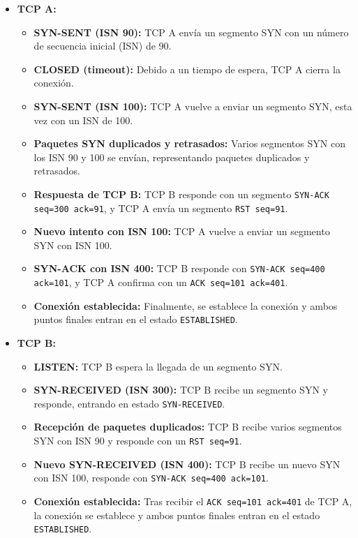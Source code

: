 \documentclass[a4paper,12pt]{article}
\begin{document}
\begin{itemize}
    \item \textbf{TCP A:}
    \begin{itemize}
        \item \textbf{SYN-SENT (ISN 90):} TCP A envía un segmento SYN con un número de secuencia inicial (ISN) de 90.
        \item \textbf{CLOSED (timeout):} Debido a un tiempo de espera, TCP A cierra la conexión.
        \item \textbf{SYN-SENT (ISN 100):} TCP A vuelve a enviar un segmento SYN, esta vez con un ISN de 100.
        \item \textbf{Paquetes SYN duplicados y retrasados:} Varios segmentos SYN con los ISN 90 y 100 se envían, representando paquetes duplicados y retrasados.
        \item \textbf{Respuesta de TCP B:} TCP B responde con un segmento \texttt{SYN-ACK seq=300 ack=91}, y TCP A envía un segmento \texttt{RST seq=91}.
        \item \textbf{Nuevo intento con ISN 100:} TCP A vuelve a enviar un segmento SYN con ISN 100.
        \item \textbf{SYN-ACK con ISN 400:} TCP B responde con \texttt{SYN-ACK seq=400 ack=101}, y TCP A confirma con un \texttt{ACK seq=101 ack=401}.
        \item \textbf{Conexión establecida:} Finalmente, se establece la conexión y ambos puntos finales entran en el estado \texttt{ESTABLISHED}.
    \end{itemize}

    \item \textbf{TCP B:}
    \begin{itemize}
        \item \textbf{LISTEN:} TCP B espera la llegada de un segmento SYN.
        \item \textbf{SYN-RECEIVED (ISN 300):} TCP B recibe un segmento SYN y responde, entrando en estado \texttt{SYN-RECEIVED}.
        \item \textbf{Recepción de paquetes duplicados:} TCP B recibe varios segmentos SYN con ISN 90 y responde con un \texttt{RST seq=91}.
        \item \textbf{Nuevo SYN-RECEIVED (ISN 400):} TCP B recibe un nuevo SYN con ISN 100, responde con \texttt{SYN-ACK seq=400 ack=101}.
        \item \textbf{Conexión establecida:} Tras recibir el \texttt{ACK seq=101 ack=401} de TCP A, la conexión se establece y ambos puntos finales entran en el estado \texttt{ESTABLISHED}.
    \end{itemize}
\end{itemize}
\end{document}
